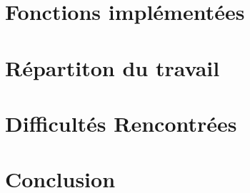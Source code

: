 \documentclass{report}
\begin{document}
 





\section*{Fonctions implémentées}


\section*{Répartiton du travail}

\section*{Difficultés Rencontrées}



\section*{Conclusion}
\end{document}
